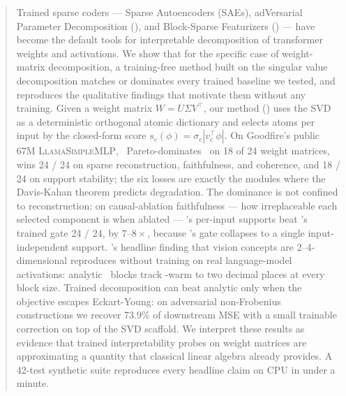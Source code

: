 \begin{abstract}
Trained sparse coders --- Sparse Autoencoders (SAEs), adVersarial Parameter Decomposition (\vpd), and Block-Sparse Featurizers (\bsf) --- have become the default tools for interpretable decomposition of transformer weights and activations. We show that for the specific case of weight-matrix decomposition, a training-free method built on the singular value decomposition matches or dominates every trained baseline we tested, and reproduces the qualitative findings that motivate them without any training. Given a weight matrix $W = U\Sigma V^\top$, our method (\svdomp) uses the SVD as a deterministic orthogonal atomic dictionary and selects atoms per input by the closed-form score $s_c(\phi) = \sigma_c |v_c^\top \phi|$. On Goodfire's public 67M \textsc{LlamaSimpleMLP}, \svdomp\ Pareto-dominates \vpd\ on 18 of 24 weight matrices, wins 24 / 24 on sparse reconstruction, faithfulness, and coherence, and 18 / 24 on support stability; the six losses are exactly the modules where the Davis-Kahan theorem predicts degradation. The dominance is not confined to reconstruction: on causal-ablation faithfulness --- how irreplaceable each selected component is when ablated --- \svdomp's per-input supports beat \vpd's trained gate 24 / 24, by $7$--$8\times$, because \vpd's gate collapses to a single input-independent support. \bsf's headline finding that vision concepts are 2--4-dimensional reproduces without training on real language-model activations: analytic \svdomp\ blocks track \bsf-warm to two decimal places at every block size. Trained decomposition can beat analytic only when the objective escapes Eckart-Young: on adversarial non-Frobenius constructions we recover 73.9\% of downstream MSE with a small trainable correction on top of the SVD scaffold. We interpret these results as evidence that trained interpretability probes on weight matrices are approximating a quantity that classical linear algebra already provides. A 42-test synthetic suite reproduces every headline claim on CPU in under a minute.
\end{abstract}
